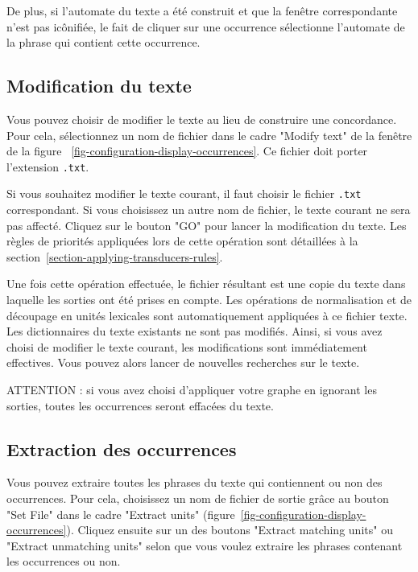 \noindent De plus, si l’automate du texte a été construit et que la fenêtre correspondante n’est
pas icônifiée, le fait de cliquer sur une occurrence sélectionne l’automate de la phrase qui
contient cette occurrence.


\subsection{Modification du texte}
\label{section-modifying-text}
Vous pouvez choisir de modifier le texte au lieu de construire une concordance. Pour
cela, sélectionnez un nom de fichier dans le cadre "Modify text" de la fenêtre de la figure
~\ref{fig-configuration-display-occurrences}. Ce fichier doit porter l’extension \verb+.txt+.

\bigskip
\noindent Si vous souhaitez modifier le texte courant, il faut choisir le fichier \verb+.txt+                                                                                correspondant.
Si vous choisissez un autre nom de fichier, le texte courant ne sera pas affecté. Cliquez sur le
bouton "GO" pour lancer la modification du texte. Les règles de priorités appliquées lors de
cette opération sont détaillées à la section~\ref{section-applying-transducers-rules}.

\bigskip
\noindent Une fois cette opération effectuée, le fichier résultant est une copie du texte dans
laquelle les sorties ont été prises en compte. Les opérations de normalisation et de découpage en
unités lexicales sont automatiquement appliquées à ce fichier texte. Les dictionnaires du texte
existants ne sont pas modifiés. Ainsi, si vous avez choisi de modifier le texte courant, les 
modifications sont immédiatement effectives. Vous pouvez alors lancer de nouvelles recherches
sur le texte.


\bigskip
\noindent ATTENTION : si vous avez choisi d’appliquer votre graphe en ignorant les sorties, toutes
les occurrences seront effacées du texte.





\subsection{Extraction des occurrences}
Vous pouvez extraire toutes les phrases du texte qui contiennent ou non des occurrences.
Pour cela, choisissez un nom de fichier de sortie grâce au bouton "Set File" dans le cadre
"Extract units" (figure~\ref{fig-configuration-display-occurrences}). Cliquez ensuite sur un des
boutons "Extract matching units" ou "Extract unmatching units" selon que vous voulez extraire les
phrases contenant les occurrences ou non.



